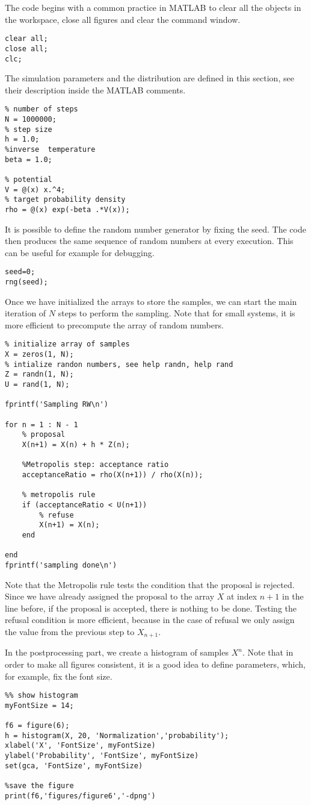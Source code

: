 \documentclass{scrartcl}
\begin{document}
The code begins with a common practice in MATLAB to clear all the objects in the workspace, close all figures and clear the command window.
\begin{verbatim}
clear all;
close all;
clc;
\end{verbatim}
The simulation parameters and the distribution are defined in this section, see their description inside the MATLAB comments.
\begin{verbatim}
% number of steps 
N = 1000000;
% step size
h = 1.0;
%inverse  temperature 
beta = 1.0;

% potential
V = @(x) x.^4;
% target probability density
rho = @(x) exp(-beta .*V(x));
\end{verbatim}
It is possible to define the random number generator by fixing the seed. The code then produces the same sequence of random numbers at every execution. This can be useful for example for debugging.
\begin{verbatim}
seed=0;
rng(seed);
\end{verbatim}
Once we have initialized the arrays to store the samples, we can start the main iteration of $N$ steps to perform the sampling. Note that for small systems, it is more efficient to precompute the array of random numbers.
\begin{verbatim}
% initialize array of samples
X = zeros(1, N); 
% intialize randon numbers, see help randn, help rand
Z = randn(1, N);
U = rand(1, N);

fprintf('Sampling RW\n')

for n = 1 : N - 1    
    % proposal 
    X(n+1) = X(n) + h * Z(n);
    
    %Metropolis step: acceptance ratio
    acceptanceRatio = rho(X(n+1)) / rho(X(n));
    
    % metropolis rule
    if (acceptanceRatio < U(n+1))
        % refuse
        X(n+1) = X(n);
    end
    
end
fprintf('sampling done\n')
\end{verbatim}
Note that the Metropolis rule tests the condition that the proposal is rejected. Since we have already assigned the proposal to the array $X$ at index $n+1$ in the line before, if the proposal is accepted, there is nothing to be done. Testing the refusal condition is more efficient, because in the case of refusal we only assign the value from the previous step to $X_{n+1}$.

In the postprocessing part, we create a histogram of samples $X^n$. Note that in order to make all figures consistent, it is a good idea to define parameters, which, for example, fix the font size. 
\begin{verbatim}
%% show histogram
myFontSize = 14;

f6 = figure(6);
h = histogram(X, 20, 'Normalization','probability');
xlabel('X', 'FontSize', myFontSize)
ylabel('Probability', 'FontSize', myFontSize)
set(gca, 'FontSize', myFontSize)

%save the figure
print(f6,'figures/figure6','-dpng')
\end{verbatim}
\end{document}
